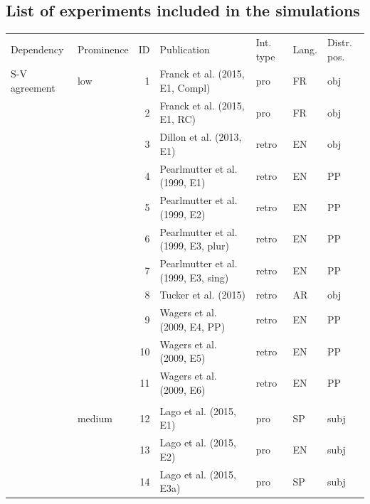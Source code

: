 \documentclass{cambridge7A}\usepackage[]{graphicx}\usepackage[]{color}
\begin{document}
\begin{subappendices}
\clearpage
\section{List of experiments included in the simulations}

\begin{table}[!htbp]
\centering
{\scriptsize
\begin{tabular}{llrllll}
Dependency     & Prominence & ID & Publication                         & Int. type & Lang. & Distr. pos. \\
S-V agreement  & low      & 1     & Franck et al. (2015, E1, Compl)     & pro     & FR   & obj \\
               &            & 2     & Franck et al. (2015, E1, RC)        & pro     & FR   & obj \\
               &            & 3     & Dillon et al. (2013, E1)            & retro   & EN   & obj \\
               &            & 4     & Pearlmutter et al. (1999, E1)       & retro   & EN   & PP \\
               &            & 5     & Pearlmutter et al. (1999, E2)       & retro   & EN   & PP \\
               &            & 6     & Pearlmutter et al. (1999, E3, plur) & retro   & EN   & PP \\
               &            & 7     & Pearlmutter et al. (1999, E3, sing) & retro   & EN   & PP \\
               &            & 8     & Tucker et al. (2015)                & retro   & AR   & obj \\
               &            & 9     & Wagers et al. (2009, E4, PP)        & retro   & EN   & PP \\
               &            & 10    & Wagers et al. (2009, E5)            & retro   & EN   & PP \\
               &            & 11    & Wagers et al. (2009, E6)            & retro   & EN   & PP \\
&&&&&& \\
               & medium         & 12    & Lago et al. (2015, E1)              & pro     & SP   & subj \\
               &            & 13    & Lago et al. (2015, E2)              & pro     & EN   & subj \\
               &            & 14    & Lago et al. (2015, E3a)             & pro     & SP   & subj \\

\end{tabular}}
\end{table}
\end{subappendices}
\end{document}
